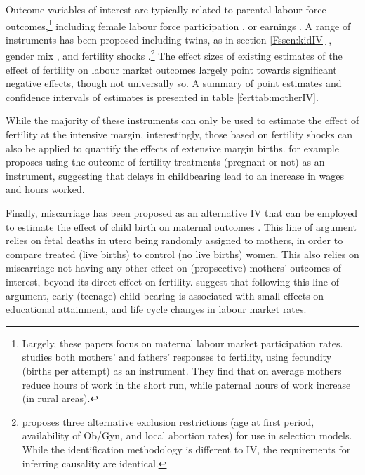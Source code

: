 Outcome variables of interest are typically related to parental labour 
force outcomes,\footnote{Largely, these papers focus on maternal labour
market participation rates. \citet{KimAassve2006} studies both mothers' and
fathers' responses to fertility, using fecundity (births per attempt) as an
instrument.  They find that on average mothers reduce hours of work in the short 
run, while paternal hours of work increase (in rural areas).} including female 
labour force participation \citep{AgueroMarks2008,AgueroMarks2011,ChunOh2002,
Caceres2008,AngristEvans1998}, or earnings \citep{Caceres2006,Hotzetal1997,
Jacobsenetal1999}.  A range of instruments has been proposed including twins,
as in section \ref{Fsscn:kidIV} \citep{RosenzweigWolpin1980b,Jacobsenetal1999,
BronarsGrogger1994}, gender mix \citep{AgueroMarks2008,AgueroMarks2011,
ChunOh2002}, and fertility shocks \citep{Miller2011,Cristia2008,
RosenzweigSchultz1987}.\footnote{\citet{Ribar1994} proposes three alternative
exclusion restrictions (age at first period, availability of Ob/Gyn, and local
abortion rates) for use in selection models.  While the identification 
methodology is different to IV, the requirements for inferring causality are 
identical.}  The effect sizes of existing estimates of the effect of fertility 
on labour market outcomes largely point towards significant negative effects, 
though not universally so.  A summary of point estimates and confidence 
intervals of estimates is presented in table \ref{ferttab:motherIV}.



While the majority of these instruments can only be used to estimate the effect
of fertility at the intensive margin, interestingly, those based on fertility
shocks can also be applied to quantify the effects of extensive margin births. 
\citet{Cristia2008} for example proposes using the outcome of fertility 
treatments (pregnant or not) as an instrument, suggesting that delays in 
childbearing lead to an increase in wages and hours worked.

Finally, miscarriage has been proposed as an alternative IV that can be employed 
to estimate the effect of child birth on maternal outcomes \citep{Hotzetal2005,
Fletcher2012}. This line of argument relies on fetal deaths in utero being 
randomly assigned to mothers, in order to compare treated (live births) to 
control (no live births) women. This also relies on miscarriage not having any 
other effect on (propsective) mothers' outcomes of interest, beyond its direct 
effect on fertility. \citet{Hotzetal2005} suggest that following this line of 
argument, early (teenage) child-bearing is associated with small effects on 
educational attainment, and life cycle changes in labour market rates.

